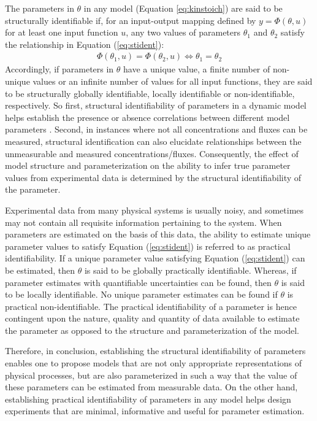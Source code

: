 \documentclass[10pt]{article}
\begin{document}
	The parameters in $\theta$ in any model (Equation \ref{eq:kinstoich}) are said to be structurally identifiable if, for an input-output mapping defined by $y = \Phi(\theta,u)$ for at least one input function $u$, any two values of parameters $\theta_1$ and $\theta_2$ satisfy the relationship in Equation (\ref{eq:stident}):
	\begin{align}\label{eq:stident}
	\Phi(\theta_1,u) = \Phi(\theta_2,u) \iff \theta_1 = \theta_2
	\end{align}
	Accordingly, if parameters in $\theta$ have a unique value, a finite number of non-unique values or an infinite number of values for all input functions, they are said to be structurally globally identifiable, locally identifiable or non-identifiable, respectively. So first, structural identifiability of parameters in a dynamic model helps establish the presence or absence correlations between different model parameters \parencite{Rodriguez-Fernandez2006}. Second, in instances where not all concentrations and fluxes can be measured, structural identification can also elucidate relationships between the unmeasurable and measured concentrations/fluxes. Consequently, the effect of model structure and parameterization on the ability to infer true parameter values from experimental data is determined by the structural identifiability of the parameter. 
		
	Experimental data from many physical systems is usually noisy, and sometimes may not contain all requisite information pertaining to the system. When parameters are estimated on the basis of this data, the ability to estimate unique parameter values to satisfy Equation (\ref{eq:stident}) is referred to as practical identifiability. If a unique parameter value satisfying Equation (\ref{eq:stident}) can be estimated, then $\theta$ is said to be globally practically identifiable. Whereas, if parameter estimates with quantifiable uncertainties can be found, then $\theta$ is said to be locally identifiable. No unique parameter estimates can be found if $\theta$ is practical non-identifiable. The practical identifiability of a parameter is hence contingent upon the nature, quality and quantity of data available to estimate the parameter as opposed to the structure and parameterization of the model. 
		
	Therefore, in conclusion, establishing the structural identifiability of parameters enables one to propose models that are not only appropriate representations of physical processes, but are also parameterized in such a way that the value of these parameters can be estimated from measurable data. On the other hand, establishing practical identifiability of parameters in any model helps design experiments that are minimal, informative and useful for parameter estimation.		
\end{document}
